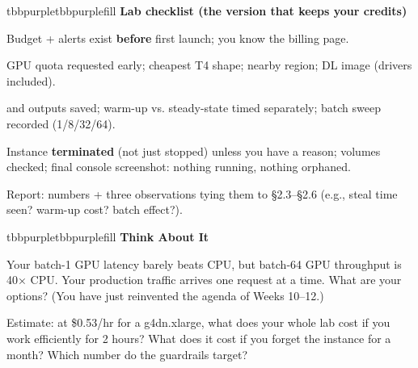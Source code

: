 \begin{calloutbox}{tbbpurple}{tbbpurplefill}
{\normalsize\bfseries\color{tbbpurple}Lab checklist (the version that keeps your credits)}\par\vspace{3pt}
\begin{tbbitemize}
  \item Budget + alerts exist \textbf{before} first launch; you know the billing page.
  \item GPU quota requested early; cheapest T4 shape; nearby region; DL image (drivers included).
  \item {} and  outputs saved; warm-up vs. steady-state timed separately; batch sweep recorded (1/8/32/64).
  \item Instance \textbf{terminated} (not just stopped) unless you have a reason; volumes checked; final console screenshot: nothing running, nothing orphaned.
  \item Report: numbers + three observations tying them to §2.3–§2.6 (e.g., steal time seen? warm-up cost? batch effect?).
\end{tbbitemize}
\end{calloutbox}

\vspace{3.0pt}

\begin{calloutbox}{tbbpurple}{tbbpurplefill}
{\normalsize\bfseries\color{tbbpurple}Think About It}\par\vspace{3pt}
\begin{tbbitemize}
  \item Your batch-1 GPU latency barely beats CPU, but batch-64 GPU throughput is 40× CPU. Your production traffic arrives one request at a time. What are your options? (You have just reinvented the agenda of Weeks 10–12.)
  \item Estimate: at \$0.53/hr for a g4dn.xlarge, what does your whole lab cost if you work efficiently for 2 hours? What does it cost if you forget the instance for a month? Which number do the guardrails target?
\end{tbbitemize}
\end{calloutbox}




